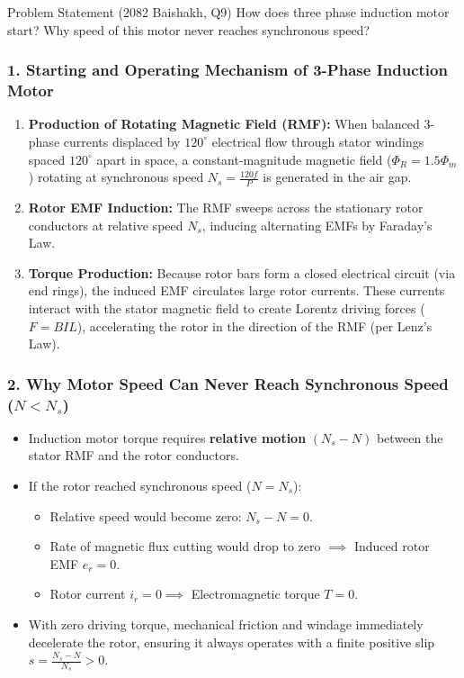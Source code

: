 \documentclass[11pt,a4paper,oneside]{article}
\begin{document}
\begin{questionbox}{Problem Statement (2082 Baishakh, Q9)}
How does three phase induction motor start? Why speed of this motor never reaches synchronous speed?
\end{questionbox}

\subsubsection*{1. Starting and Operating Mechanism of 3-Phase Induction Motor}
\begin{enumerate}[leftmargin=1.5em]
  \item \textbf{Production of Rotating Magnetic Field (RMF):} When balanced 3-phase currents displaced by $120^\circ$ electrical flow through stator windings spaced $120^\circ$ apart in space, a constant-magnitude magnetic field ($\Phi_R = 1.5 \Phi_m$) rotating at synchronous speed $N_s = \frac{120f}{P}$ is generated in the air gap.
  \item \textbf{Rotor EMF Induction:} The RMF sweeps across the stationary rotor conductors at relative speed $N_s$, inducing alternating EMFs by Faraday's Law.
  \item \textbf{Torque Production:} Because rotor bars form a closed electrical circuit (via end rings), the induced EMF circulates large rotor currents. These currents interact with the stator magnetic field to create Lorentz driving forces ($F = B I L$), accelerating the rotor in the direction of the RMF (per Lenz's Law).
\end{enumerate}

\subsubsection*{2. Why Motor Speed Can Never Reach Synchronous Speed ($N < N_s$)}
\begin{itemize}[leftmargin=1.5em]
  \item Induction motor torque requires \textbf{relative motion} $(N_s - N)$ between the stator RMF and the rotor conductors.
  \item If the rotor reached synchronous speed ($N = N_s$):
    \begin{itemize}
      \item Relative speed would become zero: $N_s - N = 0$.
      \item Rate of magnetic flux cutting would drop to zero $\implies$ Induced rotor EMF $e_r = 0$.
      \item Rotor current $i_r = 0 \implies$ Electromagnetic torque $T = 0$.
    \end{itemize}
  \item With zero driving torque, mechanical friction and windage immediately decelerate the rotor, ensuring it always operates with a finite positive slip $s = \frac{N_s - N}{N_s} > 0$.
\end{itemize}
\end{document}
